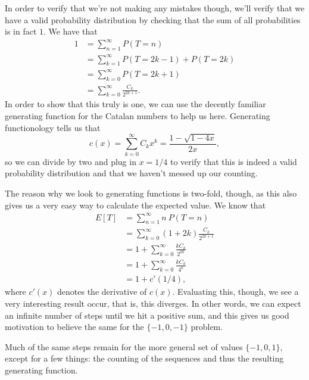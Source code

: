 \documentclass[a4paper, 12pt]{article}
\begin{document}
In order to verify that we're not making any mistakes though, we'll verify that we have a valid probability distribution by checking that the sum of all probabilities is in fact $1$. We have that
\begin{align*}
    1 &= \sum_{n = 1}^{\infty} P(T = n) \\
    &= \sum_{k = 1}^{\infty} P(T = 2k - 1) + P(T = 2k) \\
    &= \sum_{k = 0}^{\infty} P(T = 2k + 1) \\
    &= \sum_{k = 0}^{\infty} \frac{C_k}{2^{2k + 1}}
.\end{align*}
In order to show that this truly is one, we can use the decently familiar generating function for the Catalan numbers to help us here. Generating functionology tells us that
$$c(x) = \sum_{k = 0}^{\infty} C_k x^k = \frac{1 - \sqrt{1 - 4x}}{2x},$$
so we can divide by two and plug in $x = 1/4$ to verify that this is indeed a valid probability distribution and that we haven't messed up our counting.

The reason why we look to generating functions is two-fold, though, as this also gives us a very easy way to calculate the expected value. We know that
\begin{align*}
    E[T] &= \sum_{n = 1}^{\infty} n \> P(T = n) \\
    &= \sum_{k = 0}^{\infty} (1 + 2k) \frac{C_k}{2^{2k + 1}} \\
    &= 1 + \sum_{k = 0}^{\infty} \frac{k C_k}{2^{2k}} \\
    &= 1 + \sum_{k = 0}^{\infty} \frac{k C_k}{4^k} \\
    &= 1 + c'(1/4)
,\end{align*}
where $c'(x)$ denotes the derivative of $c(x)$. Evaluating this, though, we see a very interesting result occur, that is, this diverges. In other words, we can expect an infinite number of steps until we hit a positive sum, and this gives us good motivation to believe the same for the $\{-1, 0, -1\}$ problem.


Much of the same steps remain for the more general set of values $\{-1, 0, 1\}$, except for a few things: the counting of the sequences and thus the resulting generating function.
\end{document}
